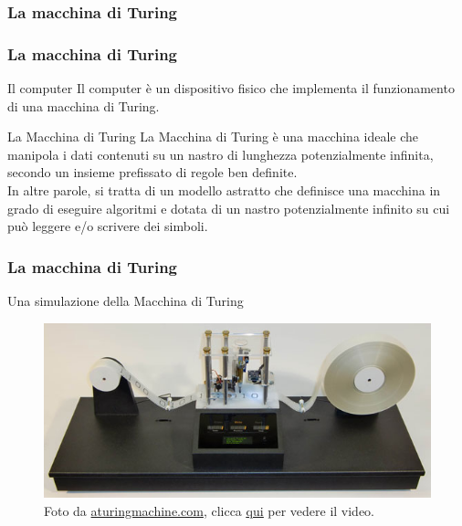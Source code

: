 \subsubsection[La macchina di Turing]{La macchina di Turing}
\begin{frame}
	\frametitle{La macchina di Turing}
	 
	\begin{block}{Il computer}
		Il computer è un dispositivo fisico che implementa il funzionamento di una macchina di Turing.
	\end{block}
	\begin{block}{La Macchina di Turing}
		La Macchina di Turing è una macchina ideale che manipola i dati contenuti su un nastro di lunghezza potenzialmente infinita, secondo un insieme prefissato di regole ben definite.\\
		In altre parole, si tratta di un modello astratto che definisce una macchina in grado di eseguire algoritmi e dotata di un nastro potenzialmente infinito su cui può leggere e/o scrivere dei simboli.
	\end{block}
\end{frame}



\begin{frame}
	\frametitle{La macchina di Turing}
	
	\begin{block}{Una simulazione della Macchina di Turing}
		\begin{figure}[!htbp]
			\centering 
			\includegraphics[width=0.9\linewidth]{images/1_i_sistemi/turing_machine.jpg}
			\caption{Foto da \href{https://aturingmachine.com/}{aturingmachine.com}, clicca \underline{\href{https://www.youtube.com/watch?v=E3keLeMwfHY}{qui}} per vedere il video.}
			\label{fig:systems_turingmachine}
		\end{figure}
	\end{block}
\end{frame}


